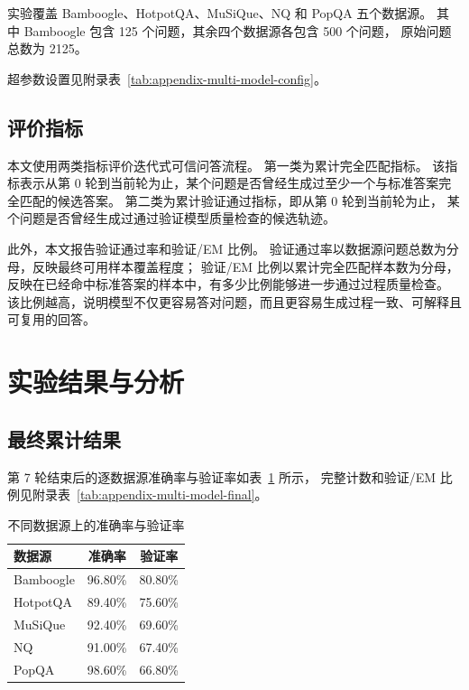 实验覆盖 Bamboogle、HotpotQA、MuSiQue、NQ 和 PopQA 五个数据源。
其中 Bamboogle 包含 125 个问题，其余四个数据源各包含 500 个问题，
原始问题总数为 2125。

超参数设置见附录表~\ref{tab:appendix-multi-model-config}。

\subsection{评价指标}

本文使用两类指标评价迭代式可信问答流程。
第一类为累计完全匹配指标。
该指标表示从第 0 轮到当前轮为止，某个问题是否曾经生成过至少一个与标准答案完全匹配的候选答案。
第二类为累计验证通过指标，即从第 0 轮到当前轮为止，
某个问题是否曾经生成过通过验证模型质量检查的候选轨迹。

此外，本文报告验证通过率和验证/EM 比例。
验证通过率以数据源问题总数为分母，反映最终可用样本覆盖程度；
验证/EM 比例以累计完全匹配样本数为分母，
反映在已经命中标准答案的样本中，有多少比例能够进一步通过过程质量检查。
该比例越高，说明模型不仅更容易答对问题，而且更容易生成过程一致、可解释且可复用的回答。

\section{实验结果与分析}

\subsection{最终累计结果}

第 7 轮结束后的逐数据源准确率与验证率如表~\ref{tab:multi-model-rates-main} 所示，
完整计数和验证/EM 比例见附录表~\ref{tab:appendix-multi-model-final}。

\begin{table}[htbp]
\caption{不同数据源上的准确率与验证率}
\label{tab:multi-model-rates-main}
\vspace{0.5em}\centering\wuhao
\begin{tabular}{lcc}
\toprule
数据源 & 准确率 & 验证率 \\
\midrule
Bamboogle & 96.80\% & 80.80\% \\
HotpotQA & 89.40\% & 75.60\% \\
MuSiQue & 92.40\% & 69.60\% \\
NQ & 91.00\% & 67.40\% \\
PopQA & 98.60\% & 66.80\% \\
\bottomrule
\end{tabular}
\end{table}

